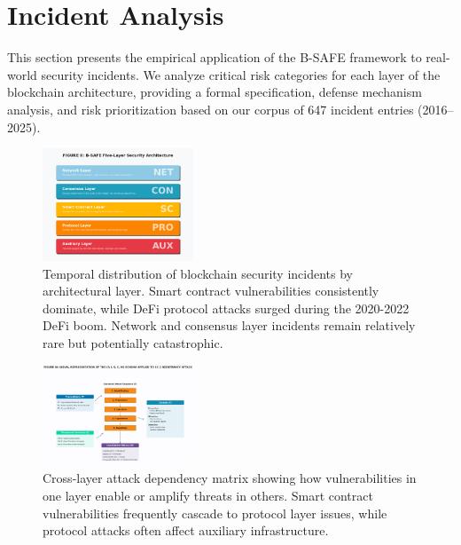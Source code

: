 \section{Incident Analysis}
\label{sec:incident_analysis}

This section presents the empirical application of the B-SAFE framework to real-world security incidents. We analyze critical risk categories for each layer of the blockchain architecture, providing a formal specification, defense mechanism analysis, and risk prioritization based on our corpus of 647 incident entries (2016--2025).

\begin{figure}[H]
\centering
\includegraphics[width=0.4\textwidth]{../figure/fig2.png}
\caption{Temporal distribution of blockchain security incidents by architectural layer. Smart contract vulnerabilities consistently dominate, while DeFi protocol attacks surged during the 2020-2022 DeFi boom. Network and consensus layer incidents remain relatively rare but potentially catastrophic.}
\label{fig:incident_timeline}
\end{figure}

\begin{figure}[H]
\centering
\includegraphics[width=0.4\textwidth]{../figure/fig3.png}
\caption{Cross-layer attack dependency matrix showing how vulnerabilities in one layer enable or amplify threats in others. Smart contract vulnerabilities frequently cascade to protocol layer issues, while protocol attacks often affect auxiliary infrastructure.}
\label{fig:cross_layer_dependencies}
\end{figure}







